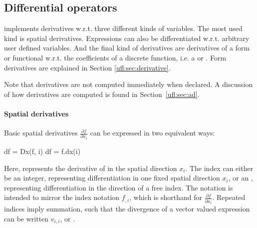 \subsection{Differential operators} \label{ufl:sec:differential}
\index{$\nabla$}

\ufl{} implements derivatives w.r.t. three different kinds of
variables.  The most used kind is spatial derivatives.  Expressions
can also be differentiated w.r.t. arbitrary user defined variables.
And the final kind of derivatives are derivatives of a form or
functional w.r.t. the coefficients of a discrete function, i.e. a
 or .  Form derivatives are
explained in Section \ref{ufl:sec:derivative}.

Note that derivatives are not computed immediately when declared.  A
discussion of how derivatives are computed is found in
Section~\ref{ufl:sec:ad}.

\paragraph{Spatial derivatives}
\label{ufl:sec:dx}

Basic spatial derivatives $\frac{\partial f}{\partial x_i}$ can be
expressed in two equivalent ways:
\begin{python}
df = Dx(f, i)
df = f.dx(i)
\end{python}
Here,  represents the derivative of  in the spatial
direction $x_i$. The index  can either be an integer,
representing differentiation in one fixed spatial direction $x_i$, or
an , representing differentiation in the direction of a
free index.  The notation  is intended to mirror the
index notation $f_{,i}$, which is shorthand for
$\frac{\partial f}{\partial x_i}$.  Repeated indices imply summation,
such that the divergence of a vector valued expression  can
be written $v_{i,i}$, or .

